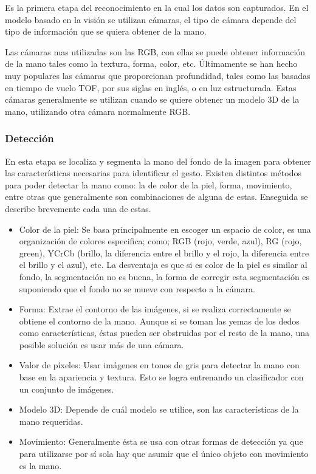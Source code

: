 Es la primera etapa del reconocimiento en la cual los datos son capturados. En el modelo basado en la visión se utilizan cámaras, el tipo de cámara depende del tipo de información que se quiera obtener de la mano. 

Las cámaras mas utilizadas son las RGB, con ellas se puede obtener información de la mano tales como la textura, forma, color, etc. Últimamente se han hecho muy populares las cámaras que proporcionan profundidad, tales como las basadas en tiempo de vuelo TOF, por sus siglas en inglés, o en luz estructurada. Estas cámaras generalmente se utilizan cuando se quiere obtener un modelo 3D de la mano, utilizando otra cámara normalmente RGB.



\subsubsection{Detección}\label{sssec:EtapaDeteccion}

En esta etapa se localiza y segmenta la mano del fondo de la imagen para obtener las características necesarias para identificar el gesto.
Existen distintos métodos para poder detectar la mano como: la de color de la piel, forma, movimiento, entre otras que generalmente son combinaciones de alguna de estas. Enseguida se describe brevemente cada una de estas.  
\begin{itemize}
\item Color de la piel: Se basa principalmente en escoger un espacio de color, es una organización de colores especifica; como; RGB (rojo, verde, azul), RG (rojo, green), YCrCb (brillo, la diferencia entre el brillo y el rojo, la diferencia entre el brillo y el azul), etc. La desventaja es que si es color de la piel es similar al fondo, la segmentación no es buena, la forma de corregir esta segmentación es suponiendo que el fondo no se mueve con respecto a la cámara.
\item Forma: Extrae el contorno de las imágenes, si se realiza correctamente se obtiene el contorno de la mano. Aunque si se toman las yemas de los dedos como características, éstas pueden ser obstruidas por el resto de la mano, una posible solución es usar más de una cámara.  
\item Valor de p\'ixeles: Usar imágenes en tonos de gris para detectar la mano con base en la apariencia y textura. Esto se logra entrenando un clasificador con un conjunto de imágenes.
\item Modelo 3D: Depende de cuál modelo se utilice, son las características de la mano requeridas. 
\item Movimiento: Generalmente ésta se usa con otras formas de detección ya que para utilizarse por sí sola hay que asumir que el único objeto con movimiento es la mano.
\end{itemize} 

